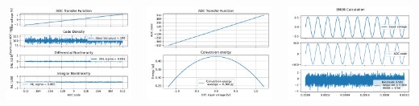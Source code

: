 \documentclass[aspectratio=169]{beamer}
\begin{document}
\begin{frame}
  \begin{columns}
    \begin{column}{0.3\textwidth}
      \includegraphics[width=.9\textwidth]{nonlinearity.pdf}
    \end{column}
    \begin{column}{0.3\textwidth}
      \includegraphics[width=.9\textwidth]{energy.pdf}
    \end{column}
    \begin{column}{0.3\textwidth}
      \includegraphics[width=.9\textwidth]{enob.pdf}
    \end{column}
  \end{columns}
\end{frame}
\end{document}
